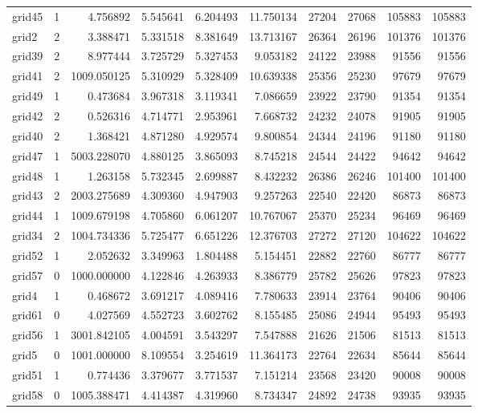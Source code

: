 \begin{longtable}{|l|r|r|r|r|r|r|r|r|r|}
grid45 & 1 & 4.756892 & 5.545641 & 6.204493 & 11.750134 & 27204 & 27068 & 105883 & 105883 \\
grid2 & 2 & 3.388471 & 5.331518 & 8.381649 & 13.713167 & 26364 & 26196 & 101376 & 101376 \\
grid39 & 2 & 8.977444 & 3.725729 & 5.327453 & 9.053182 & 24122 & 23988 & 91556 & 91556 \\
grid41 & 2 & 1009.050125 & 5.310929 & 5.328409 & 10.639338 & 25356 & 25230 & 97679 & 97679 \\
grid49 & 1 & 0.473684 & 3.967318 & 3.119341 & 7.086659 & 23922 & 23790 & 91354 & 91354 \\
grid42 & 2 & 0.526316 & 4.714771 & 2.953961 & 7.668732 & 24232 & 24078 & 91905 & 91905 \\
grid40 & 2 & 1.368421 & 4.871280 & 4.929574 & 9.800854 & 24344 & 24196 & 91180 & 91180 \\
grid47 & 1 & 5003.228070 & 4.880125 & 3.865093 & 8.745218 & 24544 & 24422 & 94642 & 94642 \\
grid48 & 1 & 1.263158 & 5.732345 & 2.699887 & 8.432232 & 26386 & 26246 & 101400 & 101400 \\
grid43 & 2 & 2003.275689 & 4.309360 & 4.947903 & 9.257263 & 22540 & 22420 & 86873 & 86873 \\
grid44 & 1 & 1009.679198 & 4.705860 & 6.061207 & 10.767067 & 25370 & 25234 & 96469 & 96469 \\
grid34 & 2 & 1004.734336 & 5.725477 & 6.651226 & 12.376703 & 27272 & 27120 & 104622 & 104622 \\
grid52 & 1 & 2.052632 & 3.349963 & 1.804488 & 5.154451 & 22882 & 22760 & 86777 & 86777 \\
grid57 & 0 & 1000.000000 & 4.122846 & 4.263933 & 8.386779 & 25782 & 25626 & 97823 & 97823 \\
grid4 & 1 & 0.468672 & 3.691217 & 4.089416 & 7.780633 & 23914 & 23764 & 90406 & 90406 \\
grid61 & 0 & 4.027569 & 4.552723 & 3.602762 & 8.155485 & 25086 & 24944 & 95493 & 95493 \\
grid56 & 1 & 3001.842105 & 4.004591 & 3.543297 & 7.547888 & 21626 & 21506 & 81513 & 81513 \\
grid5 & 0 & 1001.000000 & 8.109554 & 3.254619 & 11.364173 & 22764 & 22634 & 85644 & 85644 \\
grid51 & 1 & 0.774436 & 3.379677 & 3.771537 & 7.151214 & 23568 & 23420 & 90008 & 90008 \\
grid58 & 0 & 1005.388471 & 4.414387 & 4.319960 & 8.734347 & 24892 & 24738 & 93935 & 93935 \\

\end{longtable}
